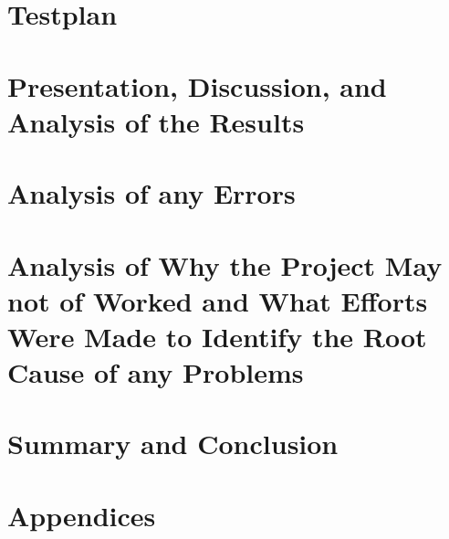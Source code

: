 \documentclass[12pt,letterpaper,onecolumn]{article}
\begin{document}
	\section{Testplan}
		
	\section{Presentation, Discussion, and Analysis of the Results}
		
	\section{Analysis of any Errors}
		
	\section{Analysis of Why the Project May not of Worked and What Efforts Were Made to Identify the Root Cause of any Problems}
		
	\section{Summary and Conclusion}
		
	\section{Appendices}
		
		
\end{document}
